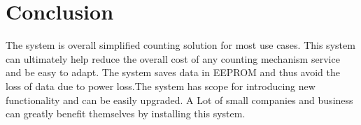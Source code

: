 \documentclass[conference]{IEEEtran}
\begin{document}
%




\section{Conclusion}

The system is overall simplified counting solution for most use cases. This system can ultimately help reduce the overall cost of any counting mechanism service and be easy to adapt. The system saves data in EEPROM and thus avoid the loss of data due to power loss.The system has scope for introducing new functionality and can be easily upgraded. A Lot of small companies and business can greatly benefit themselves by installing this system.
\end{document}
